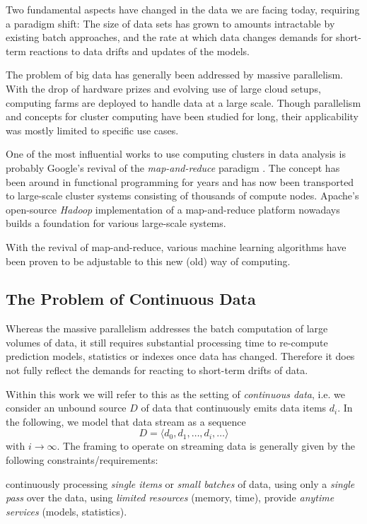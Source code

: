 Two fundamental aspects have changed in the data we are facing today,
requiring a paradigm shift: The size of data sets has grown to amounts
intractable by existing batch approaches, and the rate at which data
changes demands for short-term reactions to data drifts and updates of
the models.

The problem of big data has generally been addressed by massive
parallelism. With the drop of hardware prizes and evolving use of
large cloud setups, computing farms are deployed to handle data at a
large scale. Though parallelism and concepts for cluster computing
have been studied for long, their applicability was mostly limited to
specific use cases.

One of the most influential works to use computing clusters in data
analysis is probably Google's revival of the {\em map-and-reduce}
paradigm \cite{googleMapReduce}. The concept has been around in
functional programming for years and has now been transported to
large-scale cluster systems consisting of thousands of compute
nodes. Apache's open-source {\em Hadoop} implementation of a
map-and-reduce platform nowadays builds a foundation for various
large-scale systems.

With the revival of map-and-reduce, various machine learning algorithms
have been proven to be adjustable to this new (old) way of computing.

\subsection{The Problem of Continuous Data}
Whereas the massive parallelism addresses the batch computation of
large volumes of data, it still requires substantial processing time
to re-compute prediction models, statistics or indexes once data has
changed. Therefore it does not fully reflect the demands for reacting
to short-term drifts of data.

Within this work we will refer to this as the setting of {\em
  continuous data}, i.e. we consider an unbound source $D$ of data
that continuously emits data items $d_i$. In the following, we model
that data stream as a sequence
$$D = \langle d_0,d_1,\ldots,d_i,\ldots \rangle$$
with $i\rightarrow\infty$. The framing to operate on streaming data is
generally given by the following constraints/requirements:
\begin{itemize}
   continuously processing {\em single items} or {\em small batches} of data,
   using only a {\em single pass} over the data,
   using {\em limited resources} (memory, time),
   provide {\em anytime services} (models, statistics).
\end{itemize}


